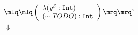 \documentclass{article}
\begin{document}
\tiny\begin{align*}
&\quot{\left(\begin{array}{l} \lambda (\mathit{y}^{\mathit{\beta}}:\mathtt{Int})\\(\sim TODO) : \mathtt{Int}\end{array}\right)}^{\varepsilon}\\ 
&\Downarrow\\ 
\end{align*}
\end{document}
